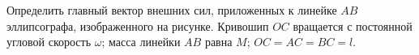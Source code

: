 Определить главный вектор внешних сил, приложенных к линейке $AB$ эллипсографа, изображенного на рисунке. Кривошип $OC$ вращается с постоянной угловой скорость $\omega$; масса линейки $AB$ равна $M$; $OC = AC = BC = l$.
